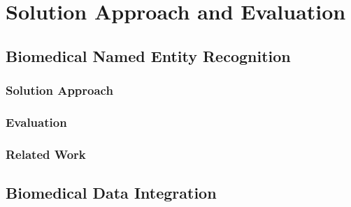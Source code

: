 \part{Solution Approach and Evaluation}

\chapter{Biomedical Named Entity Recognition}
\label{cha:biomedner}
\section{Solution Approach}
\section{Evaluation}
\section{Related Work}

\chapter{Biomedical Data Integration}
\label{cha:dataintegration}